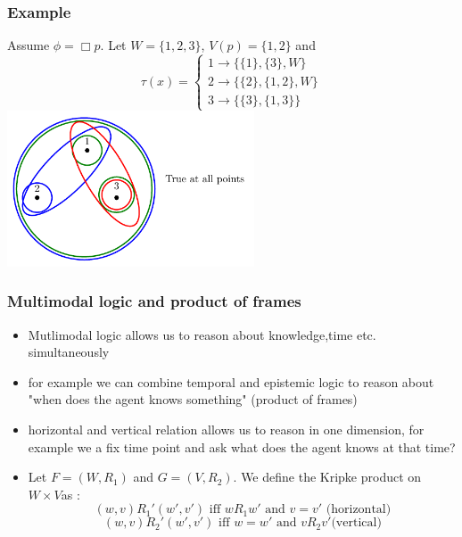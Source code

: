 \documentclass[hyperref={pdfpagelabels=false},t,10pt]{beamer}
\begin{document}
\begin{frame}
  \frametitle{Example}
      Assume $\phi = \Box p$. Let $W = \{1,2,3\}$, $V(p) = \{1,2\}$ and 
    \[
            \tau(x) = 
            \begin{cases}
                1 \rightarrow \{\{1\}, \{3\}, W\} \\
                2 \rightarrow \{\{2\}, \{1,2\}, W\} \\
                3 \rightarrow \{\{3\}, \{1,3\}\}
            \end{cases}
    \] 
    \centering
      \includegraphics[width=0.55\textwidth]{Example3.pdf}
\end{frame}

\begin{frame}
  \frametitle{Multimodal logic and product of frames}
  \begin{itemize}
    \item Mutlimodal logic allows us to reason about knowledge,time etc. simultaneously 
    \item for example we can combine temporal and epistemic logic to reason about "when does the agent knows something" (product of frames) \pause
    \item horizontal and vertical relation allows us to reason in one dimension, for example we a fix time point and ask what does the agent knows at that time?
    \item Let $F = (W, R_1)$ and $G = (V, R_2)$. We define the Kripke product on $W \times V$as : 
      $$(w,v)R_1'(w',v') \mbox{ iff } wR_1w' \mbox{ and } v = v' \text{  (horizontal)}$$
      $$(w,v)R_2  '(w',v') \mbox{ iff } w = w' \mbox{ and } vR_2v' \text{(vertical)}$$
  \end{itemize}
\end{frame}
\end{document}
